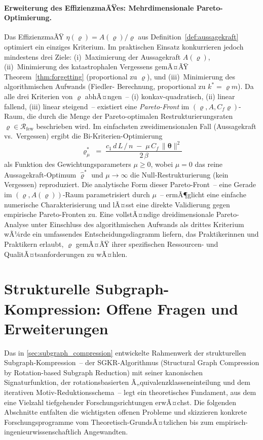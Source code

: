 ﻿\documentclass[12pt, a4paper, openany]{report}
\newcommand{\calR}{\mathcal{R}}
\begin{document}
\paragraph{Erweiterung des EffizienzmaÃŸes: Mehrdimensionale
Pareto-Optimierung.}
Das EffizienzmaÃŸ $\eta(\varrho) = A(\varrho)/\varrho$ aus
Definition~\ref{def:aussagekraft} optimiert ein einziges Kriterium.  Im
praktischen Einsatz konkurrieren jedoch mindestens drei Ziele:
(i)~Maximierung der Aussagekraft $A(\varrho)$, (ii)~Minimierung des
katastrophalen Vergessens gemÃ¤ÃŸ Theorem~\ref{thm:forgetting} (proportional
zu $\varrho$), und (iii)~Minimierung des algorithmischen Aufwands (Fiedler-
Berechnung, proportional zu $k^* = \varrho m$).  Da alle drei Kriterien
von $\varrho$ abhÃ¤ngen~-- (i) konkav-quadratisch, (ii) linear fallend,
(iii) linear steigend~-- existiert eine \emph{Pareto-Front} im
$(\varrho, A, C_f\varrho)$-Raum, die durch die Menge der Pareto-optimalen
Restrukturierungsraten $\varrho \in \calR_{\mathrm{few}}$ beschrieben wird.
Im einfachsten zweidimensionalen Fall (Aussagekraft vs.\ Vergessen) ergibt
die Bi-Kriterien-Optimierung
\[
  \varrho^*_{\mu}
  \;=\; \frac{c_1\,d\,L\,/\,n \;-\; \mu\,C_f\,\|\bm\theta\|^2}{2\,\beta}
\]
als Funktion des Gewichtungsparameters $\mu \geq 0$, wobei $\mu = 0$ das
reine Aussagekraft-Optimum $\hat\varrho^*$ und $\mu \to \infty$ die
Null-Restrukturierung (kein Vergessen) reproduziert.  Die analytische Form
dieser Pareto-Front~-- eine Gerade im $(\varrho, A(\varrho))$-Raum
parametrisiert durch $\mu$~-- ermÃ¶glicht eine einfache numerische
Charakterisierung und lÃ¤sst eine direkte Validierung gegen empirische
Pareto-Fronten zu.  Eine vollstÃ¤ndige dreidimensionale Pareto-Analyse unter
Einschluss des algorithmischen Aufwands als drittes Kriterium wÃ¼rde ein
umfassendes Entscheidungsdiagramm liefern, das Praktikerinnen und Praktikern
erlaubt, $\varrho$ gemÃ¤ÃŸ ihrer spezifischen Ressourcen- und
QualitÃ¤tsanforderungen zu wÃ¤hlen.

\section{Strukturelle Subgraph-Kompression: Offene Fragen und Erweiterungen}
\label{sec:outlook_subgraph}

Das in \cref{sec:subgraph_compression} entwickelte Rahmenwerk der strukturellen
Subgraph-Kom\-pression~-- der SGKR-Algorithmus (Structural Graph Compression by
Rotation-based Subgraph Reduction) mit seiner kanonischen Signaturfunktion,
der rotationsbasierten Ã„quivalenzklasseneinteilung und dem iterativen
Motiv-Reduktionsschema~-- legt ein theoretisches Fundament, aus dem eine
Vielzahl tiefgehender Forschungsrichtungen erwÃ¤chst.  Die folgenden Abschnitte
entfalten die wichtigsten offenen Probleme und skizzieren konkrete
Forschungsprogramme vom Theoretisch-GrundsÃ¤tzlichen bis zum
empirisch-ingenieurwissenschaftlich Angewandten.
\end{document}
